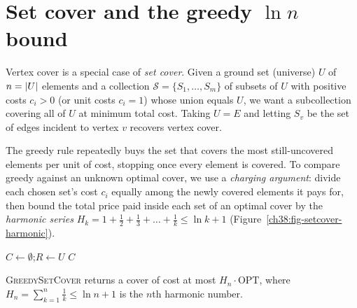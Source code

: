 \section{Set cover and the greedy $\ln n$ bound}

Vertex cover is a special case of \emph{set cover}. Given a ground set (universe) $U$ of $n = \lvert U\rvert$
elements and a collection $\mathcal{S}=\{S_1,\dots,S_m\}$ of subsets of $U$ with positive costs $c_i > 0$
(or unit costs $c_i = 1$) whose union equals $U$, we want a subcollection covering all of $U$ at minimum
total cost. Taking $U = E$ and letting $S_v$ be the set of edges incident to vertex $v$ recovers vertex cover.

\begin{intuitionbox}
The greedy rule repeatedly buys the set that covers the most still-uncovered elements per unit of cost,
stopping once every element is covered. To compare greedy against an unknown optimal cover, we use a
\emph{charging argument}: divide each chosen set's cost $c_i$ equally among the newly covered elements
it pays for, then bound the total price paid inside each set of an optimal cover by the \emph{harmonic
series} $H_k = 1 + \tfrac12 + \tfrac13 + \dots + \tfrac1k \le \ln k + 1$ (Figure~\ref{ch38:fig-setcover-harmonic}).
\end{intuitionbox}

\begin{algorithm}[H]
\caption{\textsc{GreedySetCover}$(U,\mathcal{S},c)$}\label{ch38:alg-setcover}
\DontPrintSemicolon
$C \gets \emptyset$;\quad $R \gets U$ 
\Return $C$\;
\end{algorithm}

\begin{theorem}\label{ch38:thm-greedy-setcover}
\textup{\textsc{GreedySetCover}} returns a cover of cost at most $H_n\cdot\mathrm{OPT}$, where
$H_n=\sum_{k=1}^n \tfrac1k \le \ln n + 1$ is the $n$th harmonic number.
\end{theorem}

